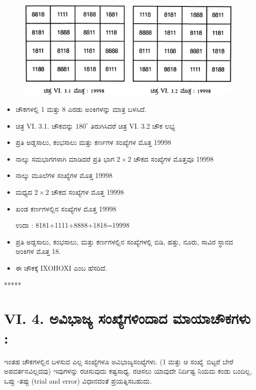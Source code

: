 \begin{figure}[H]
\includegraphics[scale=.9]{src/figures/chap5/fig5-3.jpg}
\end{figure}
\begin{itemize}
	\item ಚೌಕಗಳಲ್ಲಿ 1 ಮತ್ತು 8 ಎರಡು ಅಂಕಿಗಳನ್ನು ಮಾತ್ರ ಬಳಸಿದೆ.
	\item ಚಿತ್ರ VI. 3.1. ಚೌಕವನ್ನು $180^\circ$ ತಿರುಗಿಸಿದರೆ ಚಿತ್ರ VI. 3.2 ಚೌಕ ಲಭ್ಯ
	\item ಪ್ರತಿ ಅಡ್ಡಸಾಲು, ಕಂಭಸಾಲು ಮತ್ತು ಕರ್ಣಗಳ ಸಂಖ್ಯೆಗಳ ಮೊತ್ತ 19998
	\item ನಾಲ್ಕು ಸಮಭಾಗಗಳಾಗಿ ಮಾಡಿದರೆ ಪ್ರತಿ ಭಾಗ $2 \times 2$ ಚೌಕದ ಸಂಖ್ಯೆಗಳ ಮೊತ್ತವೂ 19998
	\item ನಾಲ್ಕು ಮೂಲೆಗಳ ಸಂಖ್ಯೆಗಳ ಮೊತ್ತ 19998
	\item ಮಧ್ಯದ $2 \times 2$ ಚೌಕದ ಸಂಖ್ಯೆಗಳ ಮೊತ್ತ 19998
	\item ಖಂಡ ಕರ್ಣಗಳಲ್ಲಿನ ಸಂಖ್ಯೆಗಳ ಮೊತ್ತ 19998

	ಉದಾ : 8181+1111+8888+1818=19998
	\item ಪ್ರತಿ ಅಡ್ಡಸಾಲು, ಕಂಭಸಾಲು, ಮತ್ತು ಕರ್ಣಗಳಲ್ಲಿನ ಸಂಖ್ಯೆಗಳಲ್ಲಿ ಬಿಡಿ, ಹತ್ತು, \linebreak ನೂರು, ಸಾವಿರ ಸ್ಥಾನದ ಅಂಕಿಗಳ ಮೊತ್ತ 18.
	\item ಈ ಚೌಕಕ್ಕೆ IXOHOXI ಎಂಬ ಹೆಸರಿದೆ.
\end{itemize}
\begin{center}
*****
\end{center}

\section*{VI. 4. ಅವಿಭಾಜ್ಯ ಸಂಖ್ಯೆಗಳಿಂದಾದ ಮಾಯಾಚೌಕಗಳು :}

ಇಂತಹ ಚೌಕಗಳಲ್ಲಿನ ಬಳಸುವ ಎಲ್ಲ ಸಂಖ್ಯೆಗಳೂ ಅವಿಭಾಜ್ಯಸಂಖ್ಯೆಗಳು. (1 ಮತ್ತು ಆ \hbox{ಸಂಖ್ಯೆ ಬಿಟ್ಟರೆ} ಬೇರೆ ಅಪವರ್ತನವಿಲ್ಲದವು) ಇವುಗಳನ್ನು ರಚಿಸುವುದು ಕಷ್ಟಸಾಧ್ಯ. ರಚಿಸಲು ಯಾವುದೇ ನಿರ್ದಿಷ್ಟ ನಿಯಮ ಕಂಡು ಬಂದಿಲ್ಲ. ಒಪ್ಪು -ತಪ್ಪು (trial and error) ವಿಧಾನದಂತೆ ಪ್ರಯತ್ನಿಸಬಹುದು.

